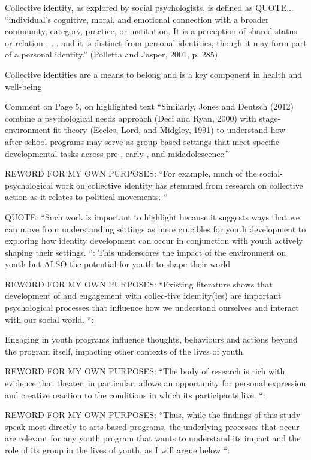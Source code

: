 Collective identity, as explored by social psychologists, is defined as QUOTE... “individual’s cognitive, moral, and emotional connection with a broader community, category, practice, or institution. It is a perception of shared status or relation . . . and it is distinct from personal identities, though it may form part of a personal identity.” (Polletta and Jasper, 2001, p. 285)



Collective identities are a means to belong and is a key component in health and well-being \cite{Futch2016}

Comment on Page 5, on highlighted text “Similarly, Jones and Deutsch (2012) combine a psychological needs approach (Deci and Ryan, 2000) with stage-environment fit theory (Eccles, Lord, and Midgley, 1991) to understand how after-school programs may serve as group-based settings that meet specific developmental tasks across pre-, early-, and midadolescence.”  %

REWORD FOR MY OWN PURPOSES: “For example, much of the social-psychological work on collective identity has stemmed from research on collective action as it relates to political movements. “

QUOTE: “Such work is important to highlight because it suggests ways that we can move from understanding settings as mere crucibles for youth development to exploring how identity development can occur in conjunction with youth actively shaping their settings. “: This underscores the impact of the environment on youth but ALSO the potential for youth to shape their world

REWORD FOR MY OWN PURPOSES: “Existing literature shows that development of and engagement with collec-tive identity(ies) are important psychological processes that influence how we understand ourselves and interact with our social world. “:

Engaging in youth programs influence thoughts, behaviours and actions beyond the program itself, impacting other contexts of the lives of youth.\cite{Futch2016}

REWORD FOR MY OWN PURPOSES: “The body of research is rich with evidence that theater, in particular, allows an opportunity for personal expression and creative reaction to the conditions in which its participants live. “:

REWORD FOR MY OWN PURPOSES: “Thus, while the findings of this study speak most directly to arts-based programs, the underlying processes that occur are relevant for any youth program that wants to understand its impact and the role of its group in the lives of youth, as I will argue below “:



